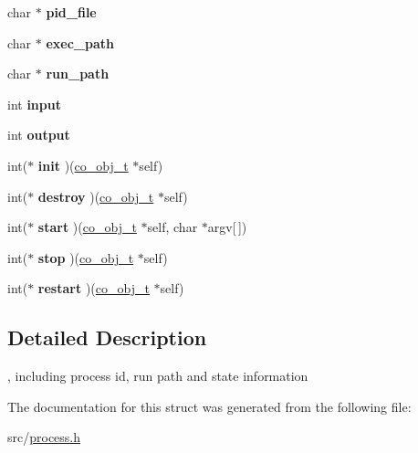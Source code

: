 \begin{DoxyCompactItemize}
\item 
\hypertarget{structco__process__t_ae73b023429180661bdee625cbf1da2ce}{char $\ast$ {\bfseries pid\+\_\+file}}\label{structco__process__t_ae73b023429180661bdee625cbf1da2ce}

\item 
\hypertarget{structco__process__t_ace3729257b036fb5e17e0db1aa8ffc0c}{char $\ast$ {\bfseries exec\+\_\+path}}\label{structco__process__t_ace3729257b036fb5e17e0db1aa8ffc0c}

\item 
\hypertarget{structco__process__t_a7787ccbd933ae38115557d75e7bb8c4c}{char $\ast$ {\bfseries run\+\_\+path}}\label{structco__process__t_a7787ccbd933ae38115557d75e7bb8c4c}

\item 
\hypertarget{structco__process__t_acf10ca9ac02775f16478c9a2241a8ae6}{int {\bfseries input}}\label{structco__process__t_acf10ca9ac02775f16478c9a2241a8ae6}

\item 
\hypertarget{structco__process__t_aeda75087324bf360bb555a2e9a146ad3}{int {\bfseries output}}\label{structco__process__t_aeda75087324bf360bb555a2e9a146ad3}

\item 
\hypertarget{structco__process__t_a1095e2cbf934b15bac1583f452c95a39}{int($\ast$ {\bfseries init} )(\hyperlink{structco__obj__t}{co\+\_\+obj\+\_\+t} $\ast$self)}\label{structco__process__t_a1095e2cbf934b15bac1583f452c95a39}

\item 
\hypertarget{structco__process__t_ae38c8137d75ef91b3071d80b762fd823}{int($\ast$ {\bfseries destroy} )(\hyperlink{structco__obj__t}{co\+\_\+obj\+\_\+t} $\ast$self)}\label{structco__process__t_ae38c8137d75ef91b3071d80b762fd823}

\item 
\hypertarget{structco__process__t_ab3eeeda3839876563540a1317903a0ad}{int($\ast$ {\bfseries start} )(\hyperlink{structco__obj__t}{co\+\_\+obj\+\_\+t} $\ast$self, char $\ast$argv\mbox{[}$\,$\mbox{]})}\label{structco__process__t_ab3eeeda3839876563540a1317903a0ad}

\item 
\hypertarget{structco__process__t_a9b9a29991575532d3ec8ef67b51229b8}{int($\ast$ {\bfseries stop} )(\hyperlink{structco__obj__t}{co\+\_\+obj\+\_\+t} $\ast$self)}\label{structco__process__t_a9b9a29991575532d3ec8ef67b51229b8}

\item 
\hypertarget{structco__process__t_afa61b0d3d4e43444bf25455299c8b5d3}{int($\ast$ {\bfseries restart} )(\hyperlink{structco__obj__t}{co\+\_\+obj\+\_\+t} $\ast$self)}\label{structco__process__t_afa61b0d3d4e43444bf25455299c8b5d3}

\end{DoxyCompactItemize}


\subsection{Detailed Description}
, including process id, run path and state information 

The documentation for this struct was generated from the following file\+:\begin{DoxyCompactItemize}
\item 
src/\hyperlink{process_8h}{process.\+h}\end{DoxyCompactItemize}
